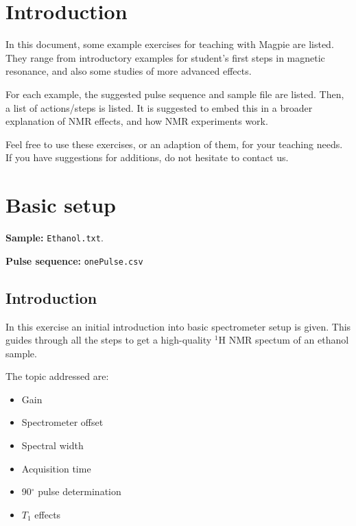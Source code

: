 \documentclass[11pt,a4paper]{article}
\renewcommand\cfttoctitlefont{\color{black!70}\Huge\fontfamily{SourceSansPro-LF}\bfseries}
\begin{document}


\thispagestyle{empty}
\newpage
\mbox{}


\renewcommand\cfttoctitlefont{\color{black}\Huge\fontfamily{SourceSansPro-LF}\bfseries}
\setcounter{tocdepth}{2}
\tableofcontents %

\renewcommand\cfttoctitlefont{\color{black!70}\Huge\fontfamily{SourceSansPro-LF}\bfseries}


\section{Introduction}
In this document, some example exercises for teaching with Magpie are listed. They range from introductory examples for student's first steps in magnetic resonance, and also some studies of more advanced effects.

For each example, the suggested pulse sequence and sample file are listed. Then, a list of actions/steps is listed. It is suggested to embed this in a broader explanation of NMR effects, and how NMR experiments work.

Feel free to use these exercises, or an adaption of them, for your teaching needs. If you have suggestions for additions, do not hesitate to contact us.

\newpage

\section{Basic setup}\label{sec:Basic}
\textbf{Sample:} \texttt{Ethanol.txt}.

\textbf{Pulse sequence:} \texttt{onePulse.csv}

\subsection{Introduction}
In this exercise an initial introduction into basic spectrometer setup is given. This guides through all the steps to get a high-quality $^1$H NMR spectum of an ethanol sample.

The topic addressed are:
\begin{itemize}
\item Gain
\item Spectrometer offset
\item Spectral width
\item Acquisition time
\item 90$^\circ$ pulse determination
\item $T_1$ effects
\end{itemize}
\end{document}
